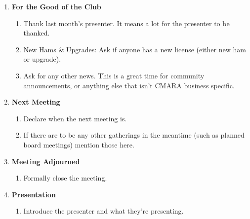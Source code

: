 \documentclass[10pt,letterpaper]{article}
\begin{document}
\begin{enumerate}
  \item \textbf{For the Good of the Club}
  \begin{enumerate}
    \item Thank last month's presenter. It means a lot for the presenter to be thanked.
    \item New Hams \& Upgrades: Ask if anyone has a new license (either new ham or upgrade).
    \item Ask for any other news. This is a great time for community announcements, or anything else that isn't CMARA business specific.
  \end{enumerate}

  \item \textbf{Next Meeting}
  \begin{enumerate}
    \item Declare when the next meeting is.
    \item If there are to be any other gatherings in the meantime (such as planned board meetings) mention those here.
  \end{enumerate}

  \item \textbf{Meeting Adjourned}
  \begin{enumerate}
    \item Formally close the meeting.
  \end{enumerate}

  \item \textbf{Presentation}
  \begin{enumerate}
    \item Introduce the presenter and what they're presenting.
  \end{enumerate}

\end{enumerate}
\end{document}
